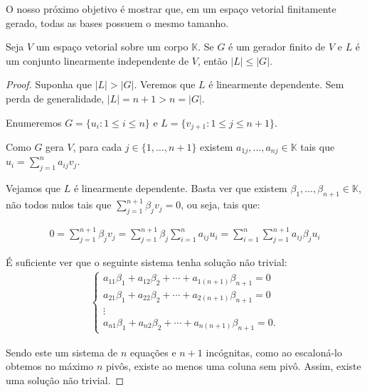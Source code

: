 O nosso próximo objetivo é mostrar que, em um espaço vetorial finitamente gerado, todas as bases possuem o mesmo tamanho.
\begin{proposition}
    Seja $V$ um espaço vetorial sobre um corpo $\mathbb K$.
    Se $G$ é um gerador finito de $V$ e $L$ é um conjunto linearmente independente de $V$, então $|L| \leq |G|$.
\end{proposition}
\begin{proof}
    Suponha que $|L| > |G|$.
    Veremos que $L$ é linearmente dependente.
    Sem perda de generalidade, $|L|=n+1>n=|G|$.

    Enumeremos $G=\{u_i : 1\leq i \leq n\}$ e $L=\{v_{j+1} : 1\leq j \leq n+1\}$.

    Como $G$ gera $V$, para cada $j\in\{1, \dots, n+1\}$ existem $a_{1j}, \ldots, a_{nj} \in \mathbb K$ tais que $u_i = \sum_{j=1}^n a_{ij} v_j$.
    

    Vejamos que $L$ é linearmente dependente.
    Basta ver que existem $\beta_1, \ldots, \beta_{n+1} \in \mathbb K$, não todos nulos tais que $\sum_{j=1}^{n+1} \beta_j v_j = 0$, ou seja, tais que:

    \begin{align*}
        0=\sum_{j=1}^{n+1} \beta_j v_j =\sum_{j=1}^{n+1}\beta_j \sum_{i=1}^{n} a_{ij}u_i =\sum_{i=1}^{n}\sum_{j=1}^{n+1} a_{ij}\beta_j u_i
    \end{align*}

    É suficiente ver que o seguinte sistema tenha solução não trivial:
    \begin{align*}
        \begin{cases}
            a_{11}\beta_1 + a_{12}\beta_2 + \cdots + a_{1(n+1)}\beta_{n+1} = 0 \\
            a_{21}\beta_1 + a_{22}\beta_2 + \cdots + a_{2(n+1)}\beta_{n+1} = 0 \\
            \vdots \\
            a_{n1}\beta_1 + a_{n2}\beta_2 + \cdots + a_{n(n+1)}\beta_{n+1} = 0.
        \end{cases}
    \end{align*}

    Sendo este um sistema de $n$ equações e $n+1$ incógnitas, como ao escaloná-lo obtemos no máximo $n$ pivôs, existe ao menos uma coluna sem pivô.
    Assim, existe uma solução não trivial.
\end{proof}

